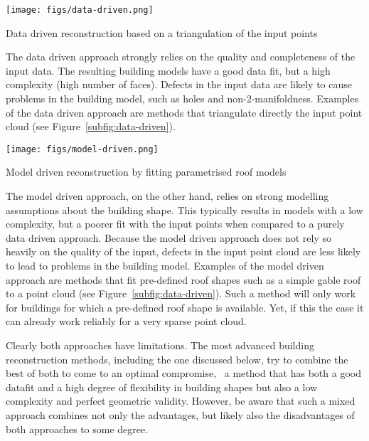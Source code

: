 \begin{marginfigure}
	\texttt{[image: figs/data-driven.png]}
	\caption[Data driven reconstruction based on a triangulation of the input points]{Data driven reconstruction based on a triangulation of the input points \citep{Axelsson99}}%
	\label{subfig:data-driven}
\end{marginfigure}
The data driven approach strongly relies on the quality and completeness of the input data.
The resulting building models have a good data fit, but a high complexity (high number of faces).
Defects in the input data are likely to cause problems in the building model, such as holes and non-2-manifoldness.
Examples of the data driven approach are methods that triangulate directly the input point cloud (see Figure~\ref{subfig:data-driven}).

\begin{marginfigure}
	\texttt{[image: figs/model-driven.png]}
	\caption[Model driven reconstruction by fitting parametrised roof models]{Model driven reconstruction by fitting parametrised roof models \citep{Lafarge10}}%
	\label{subfig:model-driven}
\end{marginfigure}
The model driven approach, on the other hand, relies on strong modelling assumptions about the building shape.
This typically results in models with a low complexity, but a poorer fit with the input points when compared to a purely data driven approach.
Because the model driven approach does not rely so heavily on the quality of the input, defects in the input point cloud are less likely to lead to problems in the building model.
Examples of the model driven approach are methods that fit pre-defined roof shapes such as a simple gable roof to a point cloud (see Figure~\ref{subfig:data-driven}). 
Such a method will only work for buildings for which a pre-defined roof shape is available.
Yet, if this the case it can already work reliably for a very sparse point cloud.

Clearly both approaches have limitations. The most advanced building reconstruction methods, including the one discussed below, try to combine the best of both to come to an optimal compromise, \eg\ a method that has both a good datafit and a high degree of flexibility in building shapes but also a low complexity and perfect geometric validity. However, be aware that such a mixed approach combines not only the advantages, but likely also the disadvantages of both approaches to some degree.

